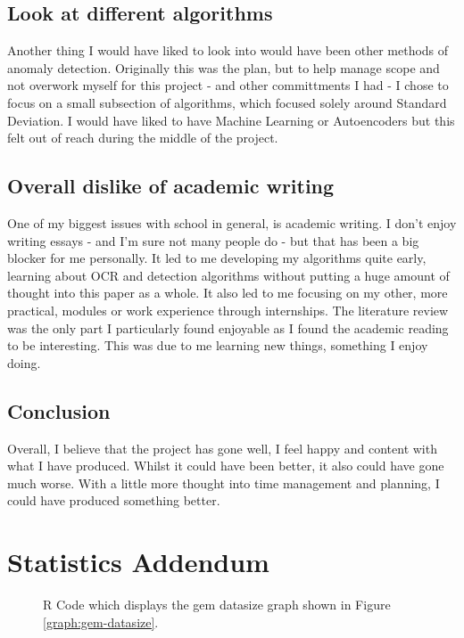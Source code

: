 \documentclass[journal]{IEEEtran}
\begin{document}
\begin{appendices}
\begin{appendices}
        \subsection{Look at different algorithms}
        Another thing I would have liked to look into would have been other methods of anomaly detection. Originally this was the plan, but to help manage scope and not overwork myself for this project - and other committments I had - I chose to focus on a small subsection of algorithms, which focused solely around Standard Deviation. I would have liked to have Machine Learning or Autoencoders but this felt out of reach during the middle of the project.

        \subsection{Overall dislike of academic writing}
        One of my biggest issues with school in general, is academic writing. I don't enjoy writing essays - and I'm sure not many people do - but that has been a big blocker for me personally. It led to me developing my algorithms quite early, learning about OCR and detection algorithms without putting a huge amount of thought into this paper as a whole. It also led to me focusing on my other, more practical, modules or work experience through internships. The literature review was the only part I particularly found enjoyable as I found the academic reading to be interesting. This was due to me learning new things, something I enjoy doing.

        \subsection{Conclusion}
        Overall, I believe that the project has gone well, I feel happy and content with what I have produced. Whilst it could have been better, it also could have gone much worse. With a little more thought into time management and planning, I could have produced something better. 
    \end{appendices}

    \section{Statistics Addendum}
    \label{appendix:statistics-addendum}

    
    \begin{figure}[hbt!]
        \caption{R Code which displays the gem datasize graph shown in Figure \ref{graph:gem-datasize}.}
        \label{algorithm:r-gem-datasize}
    \end{figure}


\end{appendices}
\end{document}
